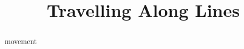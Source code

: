 \documentclass{ximera}
\title{Travelling Along Lines}
\begin{document}
\begin{abstract}
movement
\end{abstract}
\maketitle
\end{document}
